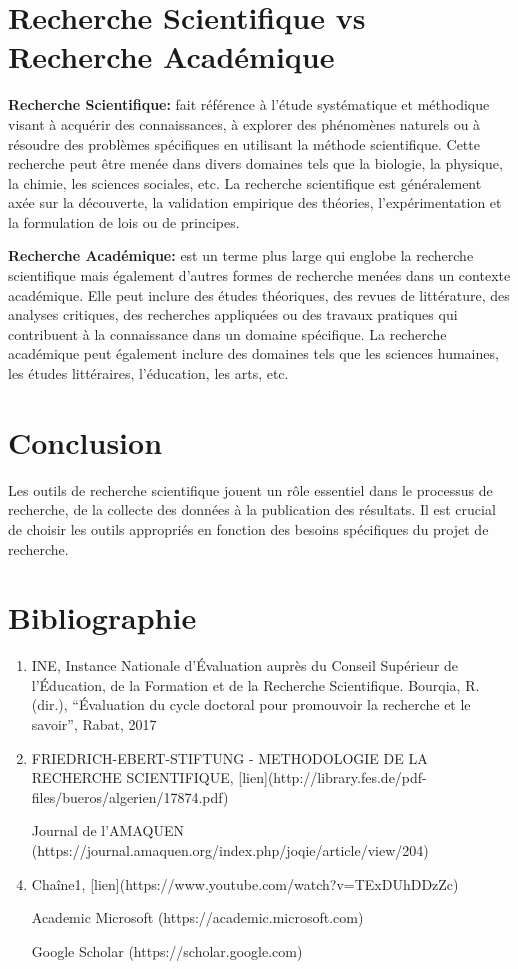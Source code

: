 \documentclass{article}
\begin{document}
\section*{Recherche Scientifique vs Recherche Académique}
\textbf{Recherche Scientifique:} fait référence à l’étude systématique et méthodique visant à acquérir des connaissances, à explorer des phénomènes naturels ou à résoudre des problèmes spécifiques en utilisant la méthode scientifique. Cette recherche peut être menée dans divers domaines tels que la biologie, la physique, la chimie, les sciences sociales, etc. La recherche scientifique est généralement axée sur la découverte, la validation empirique des théories, l’expérimentation et la formulation de lois ou de principes.

\textbf{Recherche Académique:} est un terme plus large qui englobe la recherche scientifique mais également d’autres formes de recherche menées dans un contexte académique. Elle peut inclure des études théoriques, des revues de littérature, des analyses critiques, des recherches appliquées ou des travaux pratiques qui contribuent à la connaissance dans un domaine spécifique. La recherche académique peut également inclure des domaines tels que les sciences humaines, les études littéraires, l’éducation, les arts, etc.

\section*{Conclusion}
Les outils de recherche scientifique jouent un rôle essentiel dans le processus de recherche, de la collecte des données à la publication des résultats. Il est crucial de choisir les outils appropriés en fonction des besoins spécifiques du projet de recherche.

\section*{Bibliographie}
\begin{enumerate}
    \item INE, Instance Nationale d’Évaluation auprès du Conseil Supérieur de l’Éducation, de la Formation et de la Recherche Scientifique. Bourqia, R. (dir.), “Évaluation du cycle doctoral pour promouvoir la recherche et le savoir”, Rabat, 2017
    \item FRIEDRICH-EBERT-STIFTUNG - METHODOLOGIE DE LA RECHERCHE SCIENTIFIQUE, [lien](http://library.fes.de/pdf-files/bueros/algerien/17874.pdf)
    \item [Journal de l'AMAQUEN](https://journal.amaquen.org/index.php/joqie/article/view/204)
    \item Chaîne1, [lien](https://www.youtube.com/watch?v=TExDUhDDzZc)
    \item [Academic Microsoft](https://academic.microsoft.com)
    \item [Google Scholar](https://scholar.google.com)
\end{enumerate}

\end{document}
